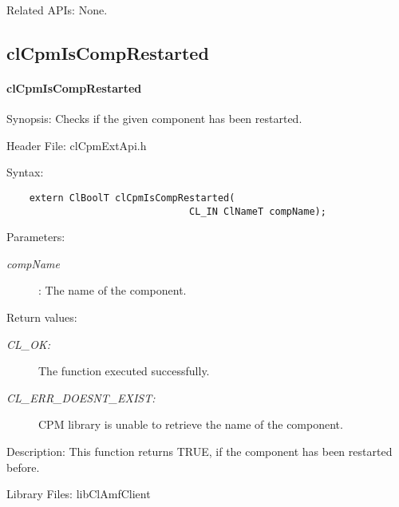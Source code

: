 {\begin{Desc}\item[Related APIs:]None.\end{Desc}

\newpage



\subsection{clCpmIsCompRestarted}
\hypertarget{pagecpm205}{}\paragraph{cl\-Cpm\-Is\-Comp\-Restarted}\label{pagecpm205}
\begin{Desc}
\item[Synopsis:]Checks if the given component has been restarted.\end{Desc}
\begin{Desc}
\item[Header File:]clCpmExtApi.h\end{Desc}
\begin{Desc}
\item[Syntax:]

\footnotesize\begin{verbatim}    extern ClBoolT clCpmIsCompRestarted(
                      			CL_IN ClNameT compName);
\end{verbatim}
\normalsize
\end{Desc}
\begin{Desc}
\item[Parameters:]
\begin{description}
\item[{\em comp\-Name}]: The name of the component.\end{description}
\end{Desc}
\begin{Desc}
\item[Return values:]
\begin{description}
\item[{\em CL\_\-OK:}]The function executed successfully. 
\item[{\em CL\_\-ERR\_\-DOESNT\_\-EXIST:}]CPM library is unable to retrieve the name of the component.\end{description}
\end{Desc}
\begin{Desc}
\item[Description:]This function returns TRUE, if the component has been restarted before.\end{Desc}
\begin{Desc}
\item[Library Files:]lib\-Cl\-Amf\-Client\end{Desc}

}
